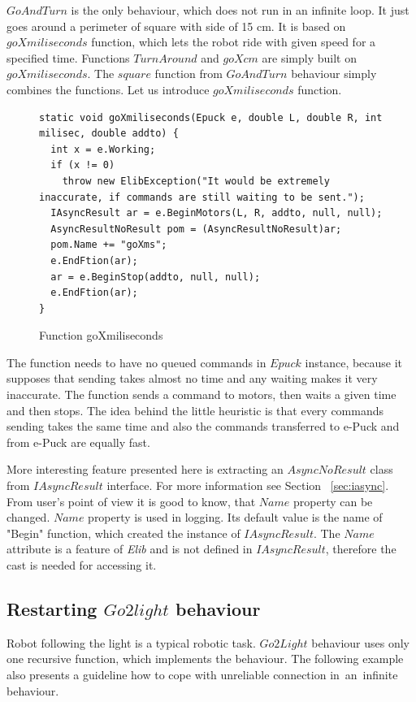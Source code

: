   $GoAndTurn$ is the only behaviour, which does not run in an infinite loop. 
  It just goes around a perimeter of square with side
  of 15 cm. It is based on $goXmiliseconds$ function, which lets the robot ride with given speed for a specified time.
  Functions $TurnAround$ and $goXcm$ are simply built on $goXmiliseconds$. The $square$ function from $GoAndTurn$ behaviour
  simply combines the functions.
  Let us introduce $goXmiliseconds$ function.
\begin{figure}[!hbp]
\begin{lstlisting}
static void goXmiliseconds(Epuck e, double L, double R, int milisec, double addto) {
  int x = e.Working;
  if (x != 0)
    throw new ElibException("It would be extremely inaccurate, if commands are still waiting to be sent.");
  IAsyncResult ar = e.BeginMotors(L, R, addto, null, null);
  AsyncResultNoResult pom = (AsyncResultNoResult)ar;
  pom.Name += "goXms";
  e.EndFtion(ar);
  ar = e.BeginStop(addto, null, null);
  e.EndFtion(ar);
}
\end{lstlisting}
\caption{Function goXmiliseconds} \label{gox}
\end{figure}

  The function needs to have no queued commands in $Epuck$ instance, 
  because it supposes that sending takes almost no time and any waiting makes it very inaccurate.
  The function sends a command to motors, then waits a given time and then stops.
  The idea behind the little heuristic is that every commands sending takes the 
  same time and also the commands transferred to e-Puck and from e-Puck are equally fast.

  More interesting feature presented here is extracting 
  an $AsyncNoResult$ class from $IAsyncResult$ interface. 
  For more information see Section ~\ref{sec:iasync}.
  From user's point of view it is good to know, that $Name$ property can be changed. 
  $Name$ property is used in logging. 
  Its default value is the name of "Begin" function,
  which created the instance of $IAsyncResult$. The $Name$ attribute is a feature of {\it Elib} 
  and is not defined in $IAsyncResult$, therefore the cast is needed for accessing it.

\subsection{Restarting $Go2light$ behaviour}\label{sec:go2light}
  Robot following the light is a typical robotic task. $Go2Light$ behaviour uses only one recursive function, which implements the behaviour.
  The following example also presents a guideline how to cope with unreliable connection 
  in~an~infinite behaviour.

